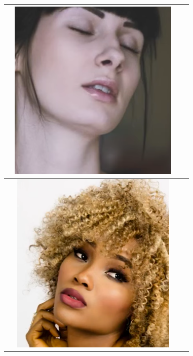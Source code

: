 \begin{longtable}{|N||c|c|c|}
\begin{minipage}{.29\textwidth}
  \end{minipage} & 
  \begin{minipage}{.29\textwidth}
    \includegraphics[width=\textwidth,height=\textheight,keepaspectratio]{images/match_other_1_res}
  \end{minipage} \\
    \hline  \label{row:photoshop_match_other_2} &
  \begin{minipage}{.29\textwidth}
    \includegraphics[width=\textwidth,height=\textheight,keepaspectratio]{images/match_other_2_orig}

\end{minipage}
\end{longtable}
